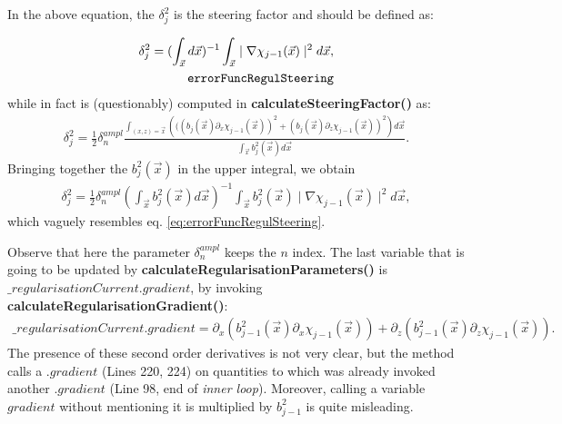 \documentclass[10pt,a4paper]{article}
\begin{document}
In the above equation, the $\delta_{j}^2$ is the steering factor and
{should} be defined as:

\begin{align} \label{eq:errorFuncRegulSteering} \delta_{j}^2 = (\int_{\vec{x}}
d\vec{x})^{-1} \int_{\vec{x}} \mid\nabla\chi_{j-1}(\vec{x})\mid^2 d\vec{x},\\
\tag*{\texttt{errorFuncRegulSteering}}
\end{align}
{while in fact is (questionably) computed in \textbf{calculateSteeringFactor()} as:
\begin{align}  \delta_j^2 = \frac{1}{2} \delta^{ampl}_n \frac{\int_{(x,z) = \vec{x}}\left(((b_j(\vec{x}) \partial_x \chi_{j-1}(\vec{x}))^2  + (b_j(\vec{x}) \partial_z \chi_{j-1}(\vec{x}))^2\right) d \vec{x}}{\int_{\vec{x}}b_j^2(\vec{x}) d \vec{x}}.
\end{align}
Bringing together the $b_j^2(\vec{x})$ in the upper integral, we obtain
\begin{align} \label{eq:errorFuncRegulSteeringWrong}
\delta_{j}^2 = \frac{1}{2} \delta^{ampl}_n \left(\int_{\vec{x}}
b_j^2(\vec{x})d\vec{x}\right)^{-1} \int_{\vec{x}} b_j^2(\vec{x}) \mid\nabla\chi_{j-1}(\vec{x})\mid^2 d\vec{x},
\end{align}
which vaguely resembles eq. \eqref{eq:errorFuncRegulSteering}.
}
\newline

{
Observe that here the parameter $\delta^{ampl}_n$ keeps the $n$ index.
}
{The last variable that is going to be updated by \textbf{calculateRegularisationParameters()} is $\_regularisationCurrent.gradient$, by invoking \textbf{calculateRegularisationGradient()}:
\begin{align} 
\label{eq:calculateRegularisationGradient}
\_regularisationCurrent.gradient = \partial_x (b^2_{j-1} (\vec{x}) \partial_x \chi_{j-1} (\vec{x}) ) + \partial_z (b^2_{j-1} (\vec{x}) \partial_z \chi_{j-1} (\vec{x}) ).
\end{align}
The presence of these second order derivatives is not very clear, but the method calls a $.gradient$ (Lines 220, 224) on quantities to which was already invoked another $.gradient$ (Line 98, end of \textit{inner loop}). 
Moreover, calling a variable $gradient$ without mentioning it is multiplied by $b_{j-1}^2$ is quite misleading.
}
\newline
\end{document}
